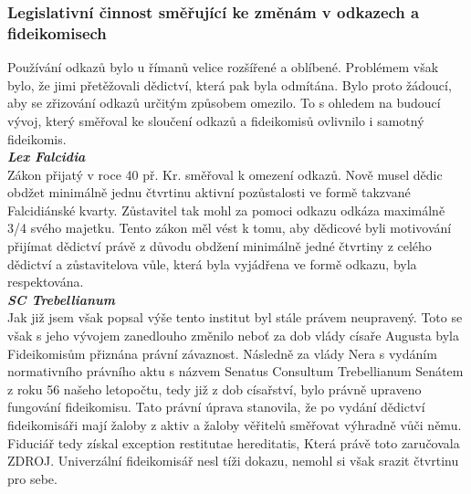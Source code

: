 \documentclass{article}
\begin{document}

\subsubsection{Legislativní činnost směřující ke změnám v odkazech a fideikomisech}

Používání odkazů bylo u římanů velice rozšířené a oblíbené. Problémem však bylo, že jimi přetěžovali dědictví, která pak byla odmítána. Bylo proto žádoucí, aby se zřizování odkazů určitým způsobem omezilo. To s ohledem na budoucí vývoj, který směřoval ke sloučení odkazů a fideikomisů ovlivnilo i samotný fideikomis.\\

\noindent\textbf{\textit{Lex Falcidia}}\\

Zákon přijatý v roce 40 př. Kr. směřoval k omezení odkazů. Nově musel dědic obdžet minimálně jednu čtvrtinu aktivní pozůstalosti ve formě takzvané Falcidiánské kvarty. Zůstavitel tak mohl za pomoci odkazu odkáza maximálně 3/4 svého majetku. Tento zákon měl vést k tomu, aby dědicové byli motivování přijímat dědictví právě z důvodu obdžení minimálně jedné čtvrtiny z celého dědictví a zůstavitelova vůle, která byla vyjádřena ve formě odkazu, byla respektována.\\

\noindent\textbf{\textit{SC Trebellianum}}\\

Jak již jsem však popsal výše tento institut byl stále právem neupravený. Toto se však s jeho vývojem zanedlouho změnilo neboť za dob vlády císaře Augusta byla Fideikomisům přiznána právní závaznost. Následně za vlády Nera s vydáním normativního právního aktu s názvem Senatus Consultum Trebellianum Senátem z roku 56 našeho letopočtu, tedy již z dob císařství, bylo právně upraveno fungování fideikomisu. Tato právní úprava stanovila, že po vydání dědictví fideikomisáři mají žaloby z aktiv a žaloby věřitelů směřovat výhradně vůči němu. Fiduciář tedy získal exception restitutae hereditatis, Která právě toto zaručovala ZDROJ. Univerzální fideikomisář nesl tíži dokazu, nemohl si však srazit čtvrtinu pro sebe.\\ 
\end{document}
